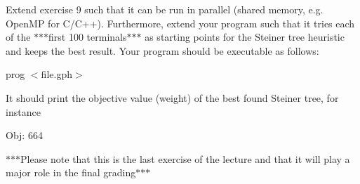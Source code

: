 Extend exercise 9 such that it can be run in parallel (shared memory, e.\+g. Open\+M\+P for C/\+C++). Furthermore, extend your program such that it tries each of the $\ast$$\ast$$\ast$first 100 terminals$\ast$$\ast$$\ast$ as starting points for the Steiner tree heuristic and keeps the best result. Your program should be executable as follows\+:


\begin{DoxyItemize}
\item prog $<$file.\+gph$>$
\end{DoxyItemize}

It should print the objective value (weight) of the best found Steiner tree, for instance


\begin{DoxyItemize}
\item Obj\+: 664
\end{DoxyItemize}

$\ast$$\ast$$\ast$\+Please note that this is the last exercise of the lecture and that it will play a major role in the final grading$\ast$$\ast$$\ast$ 